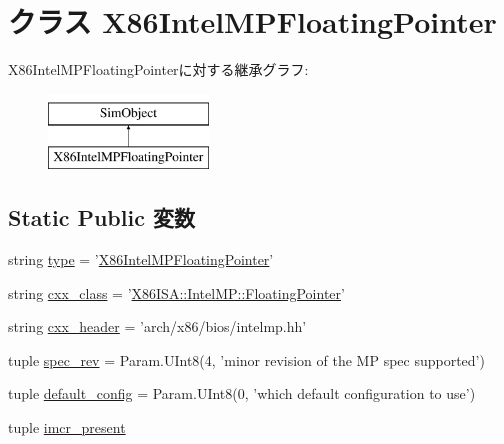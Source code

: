 \hypertarget{classIntelMP_1_1X86IntelMPFloatingPointer}{
\section{クラス X86IntelMPFloatingPointer}
\label{classIntelMP_1_1X86IntelMPFloatingPointer}
}
X86IntelMPFloatingPointerに対する継承グラフ:\begin{figure}[H]
\begin{center}
\leavevmode
\includegraphics[height=2cm]{classIntelMP_1_1X86IntelMPFloatingPointer}
\end{center}
\end{figure}
\subsection*{Static Public 変数}
\begin{DoxyCompactItemize}
\item 
string \hyperlink{classIntelMP_1_1X86IntelMPFloatingPointer_acce15679d830831b0bbe8ebc2a60b2ca}{type} = '\hyperlink{classIntelMP_1_1X86IntelMPFloatingPointer}{X86IntelMPFloatingPointer}'
\item 
string \hyperlink{classIntelMP_1_1X86IntelMPFloatingPointer_a58cd55cd4023648e138237cfc0822ae3}{cxx\_\-class} = '\hyperlink{classX86ISA_1_1IntelMP_1_1FloatingPointer}{X86ISA::IntelMP::FloatingPointer}'
\item 
string \hyperlink{classIntelMP_1_1X86IntelMPFloatingPointer_a17da7064bc5c518791f0c891eff05fda}{cxx\_\-header} = 'arch/x86/bios/intelmp.hh'
\item 
tuple \hyperlink{classIntelMP_1_1X86IntelMPFloatingPointer_a524402a2c5b41fc09fdbe3ecc1c95abb}{spec\_\-rev} = Param.UInt8(4, 'minor revision of the MP spec supported')
\item 
tuple \hyperlink{classIntelMP_1_1X86IntelMPFloatingPointer_aa65e3abaff458d5eaeb83c79cbdfc7ed}{default\_\-config} = Param.UInt8(0, 'which default configuration to use')
\item 
tuple \hyperlink{classIntelMP_1_1X86IntelMPFloatingPointer_a8b11ab6c874299f1d440bdcddc8422b5}{imcr\_\-present}
\end{DoxyCompactItemize}


